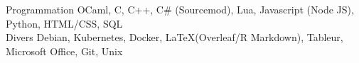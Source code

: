 

\begin{cvskills}

  \cvskill
    {Programmation} %
    {OCaml, C, C++, C\# (Sourcemod), Lua, Javascript (Node JS), Python, HTML/CSS, SQL} %
\\

  \cvskill
    {Divers} %
    {Debian, Kubernetes, Docker,  \LaTeX  (Overleaf/R Markdown), Tableur, Microsoft Office, Git, Unix} %
\\

\end{cvskills} 
\\
